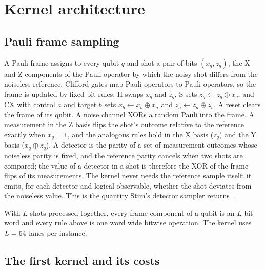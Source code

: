 \section{Kernel architecture}\label{sec:arch}

\subsection{Pauli frame sampling}\label{sec:frame-sampling}

A Pauli frame assigns to every qubit $q$ and shot a pair of bits $(x_q, z_q)$, the X and Z components of the Pauli
operator by which the noisy shot differs from the noiseless reference. Clifford gates map Pauli operators to Pauli
operators, so the frame is updated by fixed bit rules: H swaps $x_q$ and $z_q$, S sets $z_q \leftarrow z_q \oplus
x_q$, and CX with control $a$ and target $b$ sets $x_b \leftarrow x_b \oplus x_a$ and $z_a \leftarrow z_a \oplus z_b$.
A reset clears the frame of its qubit. A noise channel XORs a random Pauli into the frame. A measurement in the Z basis
flips the shot's outcome relative to the reference exactly when $x_q = 1$, and the analogous rules hold in the X basis
($z_q$) and the Y basis ($x_q \oplus z_q$). A detector is the parity of a set of measurement outcomes whose noiseless
parity is fixed, and the reference parity cancels when two shots are compared; the value of a detector in a shot is
therefore the XOR of the frame flips of its measurements. The kernel never needs the reference sample itself: it emits,
for each detector and logical observable, whether the shot deviates from the noiseless value. This is the quantity
Stim's detector sampler returns~\cite{gidney2021stim}.

With $L$ shots processed together, every frame component of a qubit is an $L$ bit word and every rule above is one
word wide bitwise operation. The kernel uses $L=64$ lanes per instance.

\subsection{The first kernel and its costs}\label{sec:first}

